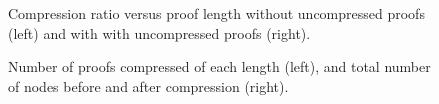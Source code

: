 


\begin{figure}
\centering
\caption{Compression ratio versus proof length without uncompressed proofs (left) and with with uncompressed proofs (right).}
\label{fig:ex1}
\end{figure}







\begin{figure}
\centering
\caption{Number of proofs compressed of each length (left), and total number of nodes before and after compression (right).}
\label{fig:ex2}
\end{figure}





